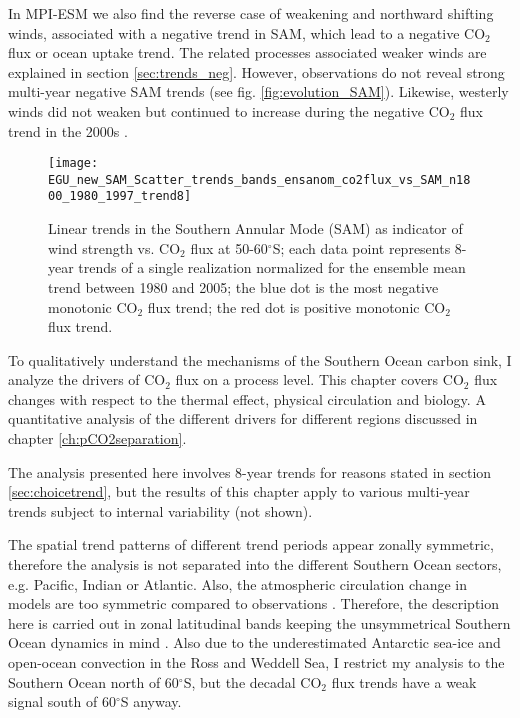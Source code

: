 \documentclass[12pt]{article}
\begin{document}
In MPI-ESM we also find the reverse case of weakening and northward shifting winds, associated with a negative trend in SAM, which lead to a negative CO$_2$ flux or ocean uptake trend. The related processes associated weaker winds are explained in section \ref{sec:trends_neg}. However, observations do not reveal strong multi-year negative SAM trends (see fig. \ref{fig:evolution_SAM}). Likewise, westerly winds did not weaken but continued to increase during the negative CO$_2$ flux trend in the 2000s \citep{landschuetzer2015}. \newline


\begin{figure}[h!]
\centering
		\texttt{[image: EGU\_new\_SAM\_Scatter\_trends\_bands\_ensanom\_co2flux\_vs\_SAM\_n1800\_1980\_1997\_trend8]}
		
		\vspace{-2mm}
		\caption{Linear trends in the Southern Annular Mode (SAM) as indicator of wind strength vs. CO$_2$ flux at 50-60$^\circ$S; each data point represents 8-year trends of a single realization normalized for the ensemble mean trend  between 1980 and 2005; the blue dot is the most negative monotonic CO$_2$ flux trend; the red dot is positive monotonic CO$_2$ flux trend.}
		\label{fig:scatter}
\end{figure}

To qualitatively understand the mechanisms of the Southern Ocean carbon sink, I analyze the drivers of CO$_2$ flux on a process level. This chapter covers CO$_2$ flux changes with respect to the thermal effect, physical circulation and biology. A quantitative analysis of the different drivers for different regions discussed in chapter \ref{ch:pCO2separation}.

The analysis presented here involves 8-year trends for reasons stated in section \ref{sec:choicetrend}, but the results of this chapter apply to various multi-year trends subject to internal variability (not shown).

The spatial trend patterns of different trend periods appear zonally symmetric, therefore the analysis is not separated into the different Southern Ocean sectors, e.g. Pacific, Indian or Atlantic. Also, the atmospheric circulation change in models are too symmetric compared to observations \citep{Haumann2014}. Therefore, the description here is carried out in zonal latitudinal bands keeping the unsymmetrical Southern Ocean dynamics in mind \citep{Sallee2010,Talley2013}. Also due to the underestimated Antarctic sea-ice and open-ocean convection in the Ross and Weddell Sea, I restrict my analysis to the Southern Ocean north of 60$^\circ$S, but the decadal CO$_2$ flux trends have a weak signal south of 60$^\circ$S anyway. 
\end{document}
